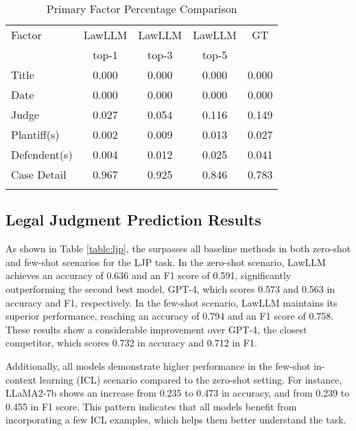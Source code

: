 \begin{table}[h]
\caption{Primary Factor Percentage Comparison}
\begin{tabular}{lcccc}
\toprule
\midrule
Factor          & LawLLM    & LawLLM    & LawLLM    & GT   \\
                & top-1     & top-3     & top-5     &       \\
\midrule
Title           & 0.000   & 0.000   & 0.000   & 0.000    \\
Date            & 0.000   & 0.000   & 0.000   & 0.000     \\
Judge           & 0.027   & 0.054   & 0.116   & 0.149     \\
Plantiff(s)     & 0.002   & 0.009   & 0.013   & 0.027     \\
Defendent(s)    & 0.004   & 0.012   & 0.025   & 0.041     \\
Case Detail     & 0.967   & 0.925   & 0.846   & 0.783     \\
\midrule
\bottomrule
\label{table:factor}
\end{tabular}
\end{table}

\subsection{Legal Judgment Prediction Results}

As shown in Table \ref{table:ljp}, the \sysname surpasses all baseline methods in both zero-shot and few-shot scenarios for the LJP task. In the zero-shot scenario, LawLLM achieves an accuracy of 0.636 and an F1 score of 0.591, significantly outperforming the second best model, GPT-4, which scores 0.573 and 0.563 in accuracy and F1, respectively. In the few-shot scenario, LawLLM maintains its superior performance, reaching an accuracy of 0.794 and an F1 score of 0.758. These results show a considerable improvement over GPT-4, the closest competitor, which scores 0.732 in accuracy and 0.712 in F1.

Additionally, all models demonstrate higher performance in the few-shot in-context learning (ICL) scenario compared to the zero-shot setting. For instance, LLaMA2-7b shows an increase from 0.235 to 0.473 in accuracy, and from 0.239 to 0.455 in F1 score. This pattern indicates that all models benefit from incorporating a few ICL examples, which helps them better understand the task.

